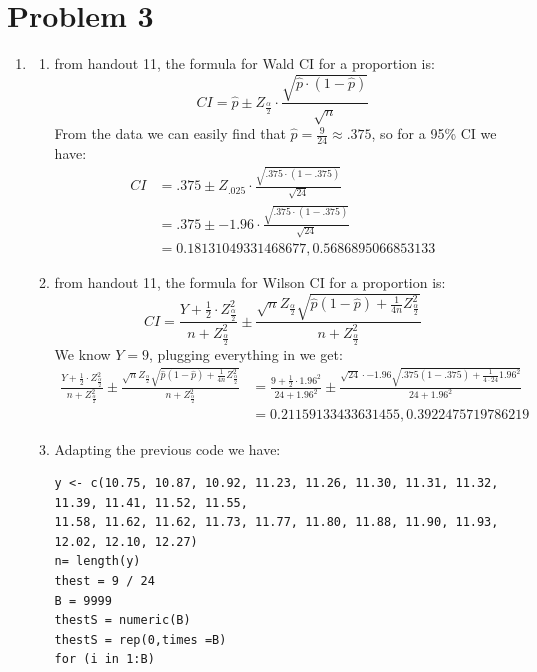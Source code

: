\documentclass{article}
\begin{document}
\section*{Problem 3}
\begin{enumerate}
\item
\begin{enumerate}
\item from handout 11, the formula for Wald CI for a proportion is: \\
\[
CI = \hat{p} \pm Z_{\frac{\alpha}{2}} \cdot \frac{\sqrt{\hat{p} \cdot (1 - \hat{p})}}{\sqrt{n}}
\]
From the data we can easily find that $\hat{p} = \frac{9}{24} \approx .375$, so for a 95\% CI we have: \\
\begin{align*}
CI &= .375 \pm Z_{.025} \cdot \frac{\sqrt{.375 \cdot (1 - .375)}}{\sqrt{24}} \\
&= .375 \pm -1.96 \cdot \frac{\sqrt{.375 \cdot (1 - .375)}}{\sqrt{24}} \\
&= 0.18131049331468677, 0.5686895066853133
\end{align*}
\item from handout 11, the formula for Wilson CI for a proportion is: \\
\[
CI = \frac{Y + \frac{1}{2} \cdot Z_{\frac{\alpha}{2}}^2}{n + Z_{\frac{\alpha}{2}}^2} \pm \frac{\sqrt{n} Z_{\frac{\alpha}{2}} \sqrt{\hat{p}(1 - \hat{p}) + \frac{1}{4n}Z_{\frac{\alpha}{2}}^2}}{n + Z_{\frac{\alpha}{2}}^2}
\]
We know $Y = 9$, plugging everything in we get: \\
\begin{align*}
\frac{Y + \frac{1}{2} \cdot Z_{\frac{\alpha}{2}}^2}{n + Z_{\frac{\alpha}{2}}^2} \pm \frac{\sqrt{n} Z_{\frac{\alpha}{2}} \sqrt{\hat{p}(1 - \hat{p}) + \frac{1}{4n}Z_{\frac{\alpha}{2}}^2}}{n + Z_{\frac{\alpha}{2}}^2} &= \frac{9 + \frac{1}{2} \cdot 1.96^2}{24 + 1.96^2} \pm \frac{\sqrt{24} \cdot -1.96 \sqrt{.375(1 - .375) + \frac{1}{4 \cdot 24}1.96^2}}{24 + 1.96^2} \\
&= 0.21159133433631455, 0.3922475719786219
\end{align*}
\item Adapting the previous code we have: \\
\begin{verbatim}
y <- c(10.75, 10.87, 10.92, 11.23, 11.26, 11.30, 11.31, 11.32, 11.39, 11.41, 11.52, 11.55,
11.58, 11.62, 11.62, 11.73, 11.77, 11.80, 11.88, 11.90, 11.93, 12.02, 12.10, 12.27)
n= length(y)
thest = 9 / 24
B = 9999
thestS = numeric(B)
thestS = rep(0,times =B)
for (i in 1:B)

\end{verbatim}
\end{enumerate}
\end{enumerate}
\end{document}
